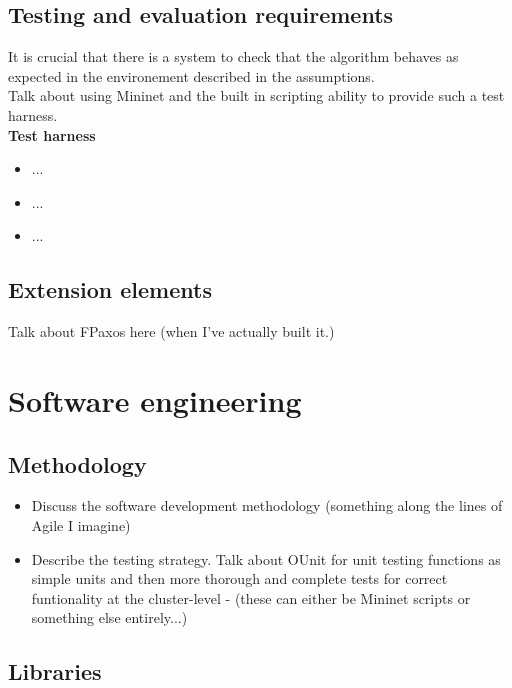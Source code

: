 \subsection{Testing and evaluation requirements}

It is crucial that there is a system to check that the algorithm behaves as expected in the environement described in the assumptions. \\

Talk about using Mininet and the built in scripting ability to provide such a test harness. \\

\textbf{Test harness}
\begin{itemize}
  \item ...
  \item ...
  \item ...
\end{itemize}

{\color{green} \subsection{Extension elements}
Talk about FPaxos here (when I've actually built it.)}




\section{Software engineering}

\subsection{Methodology}
\begin{itemize}
  \item Discuss the software development methodology (something along the lines of Agile I imagine)
  \item Describe the testing strategy. Talk about OUnit for unit testing functions as simple units and then more thorough and complete tests for correct funtionality at the cluster-level - (these can either be Mininet scripts or something else entirely...)
\end{itemize}

\subsection{Libraries}

